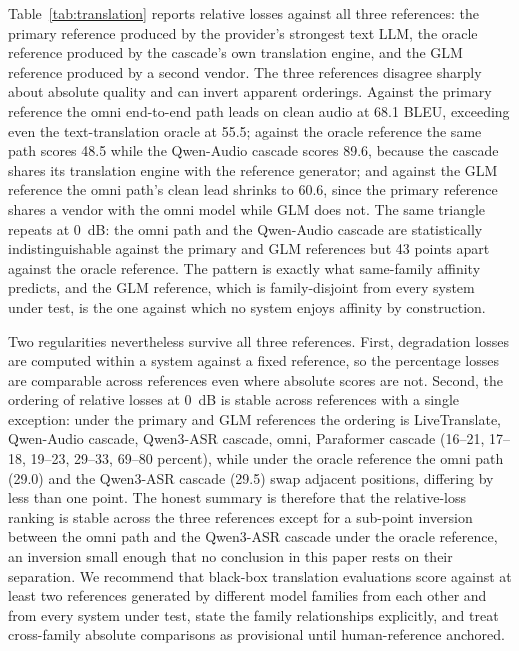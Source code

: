 Table~\ref{tab:translation} reports relative losses against all three
references: the primary reference produced by the provider's strongest
text LLM, the oracle reference produced by the cascade's own translation
engine, and the GLM reference produced by a second vendor. The three
references disagree sharply about absolute quality and can invert apparent
orderings. Against the primary reference the omni end-to-end path leads on
clean audio at 68.1 BLEU, exceeding even the text-translation oracle at
55.5; against the oracle reference the same path scores 48.5 while the
Qwen-Audio cascade scores 89.6, because the cascade shares its translation
engine with the reference generator; and against the GLM reference the
omni path's clean lead shrinks to 60.6, since the primary reference shares
a vendor with the omni model while GLM does not. The same triangle repeats
at 0~dB: the omni path and the Qwen-Audio cascade are statistically
indistinguishable against the primary and GLM references but 43 points
apart against the oracle reference. The pattern is exactly what
same-family affinity predicts, and the GLM reference, which is
family-disjoint from every system under test, is the one against which
no system enjoys affinity by construction.

Two regularities nevertheless survive all three references. First,
degradation losses are computed within a system against a fixed reference,
so the percentage losses are comparable across references even where
absolute scores are not. Second, the ordering of relative losses at 0~dB
is stable across references with a single exception: under the primary and
GLM references the ordering is LiveTranslate, Qwen-Audio cascade, Qwen3-ASR
cascade, omni, Paraformer cascade (16--21, 17--18, 19--23, 29--33, 69--80
percent), while under the oracle reference the omni path (29.0) and the
Qwen3-ASR cascade (29.5) swap adjacent positions, differing by less than
one point. The honest summary is therefore that the relative-loss ranking
is stable across the three references except for a sub-point inversion
between the omni path and the Qwen3-ASR cascade under the oracle
reference, an inversion small enough that no conclusion in this paper
rests on their separation. We recommend that black-box translation
evaluations score against at least two references generated by different
model families from each other and from every system under test, state the
family relationships explicitly, and treat cross-family absolute
comparisons as provisional until human-reference anchored.

